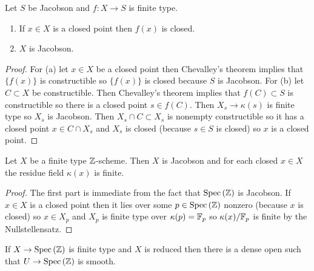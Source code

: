 \documentclass[12pt]{article}
\begin{document}
\begin{prop}
Let $S$ be Jacobson and $f : X \to S$ is finite type. 
\begin{enumerate}
\item If $x \in X$ is a closed point then $f(x)$ is closed.
\item $X$ is Jacobson.
\end{enumerate}
\end{prop}

\begin{proof}
For (a) let $x \in X$ be a closed point then Chevalley's theorem implies that $\{ f(x) \}$ is constructible so $\{ f(x) \}$ is closed because $S$ is Jacobson. For (b) let $C \subset X$ be constructible. Then Chevalley's theorem implies that $f(C) \subset S$ is constructible so there is a closed point $s \in f(C)$. Then $X_s \to \kappa(s)$ is finite type so $X_s$ is Jacobson. Then $X_s \cap C \subset X_s$ is nonempty constructible so it has a closed point $x \in C \cap X_s$ and $X_s$ is closed (because $s \in S$ is closed) so $x$ is a closed point.
\end{proof}

\begin{cor}
Let $X$ be a finite type $\mathbb{Z}$-scheme. Then $X$ is Jacobson and for each closed $x \in X$ the residue field $\kappa(x)$ is finite.
\end{cor}

\begin{proof}
The first part is immediate from the fact that $\mathrm{Spec}\left( \mathbb{Z} \right)$ is Jacobson. If $x \in X$ is a closed point then it lies over some $p \in \mathrm{Spec}\left( \mathbb{Z} \right)$ nonzero (because $x$ is closed) so $x \in X_p$ and $X_p$ is finite type over $\kappa(p) = \mathbb{F}_p$ so $\kappa(x) / \mathbb{F}_p$ is finite by the Nullstellensatz.
\end{proof}

\begin{prop}
If $X \to \mathrm{Spec}\left( \mathbb{Z} \right)$ is finite type and $X$ is reduced then there is a dense open such that $U \to \mathrm{Spec}\left( \mathbb{Z} \right)$ is smooth.
\end{prop}
\end{document}
